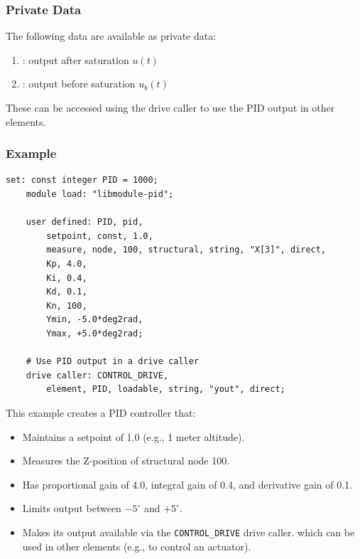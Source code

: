 \subsubsection{Private Data}

The following data are available as private data:
\begin{enumerate}
\item {}: output after saturation $u(t)$
\item {}: output before saturation $u_b(t)$
\end{enumerate}

These can be accessed using the  drive caller to use the PID output in other elements.

\subsubsection{Example}

\begin{Verbatim}[commandchars=\\\{\}]
    set: const integer PID = 1000;
    module load: "libmodule-pid";
    
    user defined: PID, pid,
        setpoint, const, 1.0,
        measure, node, 100, structural, string, "X[3]", direct,
        Kp, 4.0,
        Ki, 0.4,
        Kd, 0.1,
        Kn, 100,
        Ymin, -5.0*deg2rad,
        Ymax, +5.0*deg2rad;
    
    # Use PID output in a drive caller
    drive caller: CONTROL_DRIVE,
        element, PID, loadable, string, "yout", direct;
\end{Verbatim}

This example creates a PID controller that:
\begin{itemize}
    \item Maintains a setpoint of 1.0 (e.g., 1 meter altitude).
    \item Measures the Z-position of structural node 100.
    \item Has proportional gain of 4.0, integral gain of 0.4, and derivative gain of 0.1.
    \item Limits output between $-5^\circ$ and $+5^\circ$.
    \item Makes its output available via the \texttt{CONTROL\_DRIVE} drive caller.
        which can be used in other elements (e.g., to control an actuator).
\end{itemize}
